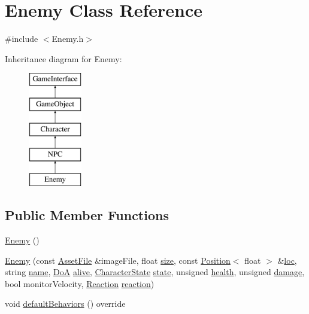 \hypertarget{class_enemy}{\section{Enemy Class Reference}
\label{class_enemy}
}


{\ttfamily \#include $<$Enemy.\-h$>$}

Inheritance diagram for Enemy\-:\begin{figure}[H]
\begin{center}
\leavevmode
\includegraphics[height=5.000000cm]{class_enemy}
\end{center}
\end{figure}
\subsection*{Public Member Functions}
\begin{DoxyCompactItemize}
\item 
\hyperlink{class_enemy_a94f30d348b6d2840fd71675472ba38dd}{Enemy} ()
\item 
\hyperlink{class_enemy_a6b0c3423456282784e8cc379e956b8a6}{Enemy} (const \hyperlink{struct_asset_file}{Asset\-File} \&image\-File, float \hyperlink{class_game_object_ac4637e122291be2421c851e2a87fb968}{size}, const \hyperlink{struct_position}{Position}$<$ float $>$ \&\hyperlink{class_game_object_a6858e668e7d2c5ded850b952aaacd905}{loc}, string \hyperlink{class_character_a2d423654566d1bf2160fef74bf04cc84}{name}, \hyperlink{_character_data_8h_acbff4d7298e294294555d39178aad448}{Do\-A} \hyperlink{class_character_ac83b99be690bb41b7fae53e9457838c6}{alive}, \hyperlink{_character_data_8h_aacbb008a93d24b04a8779bbdbd8880b5}{Character\-State} \hyperlink{class_character_ac20f1ebda238017ddc245ecdce827037}{state}, unsigned \hyperlink{class_character_ae8c0d82624dc3a171e2c3b42c699151e}{health}, unsigned \hyperlink{class_character_ae6a140637ffe5004179d90a0e04a411b}{damage}, bool monitor\-Velocity, \hyperlink{_character_data_8h_a0e5ce1612c1e71823c97a9cd734de339}{Reaction} \hyperlink{class_character_a579933775b2e4e97465bacb09c4e87f5}{reaction})
\item 
void \hyperlink{class_enemy_acec008d64103ef820006bcbcf9345a2a}{default\-Behaviors} () override
\end{DoxyCompactItemize}
